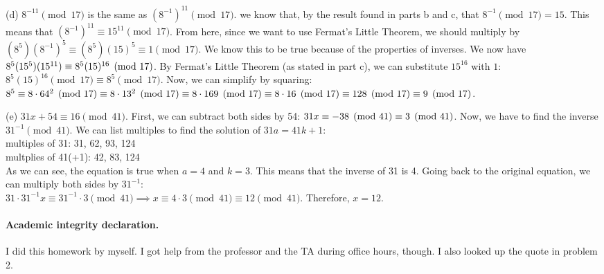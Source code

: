 \documentclass[11pt]{article}
\begin{document}
\begin{solution}
    \pagebreak
    \medskip\noindent
    (d) $8^{-11}\pmod{17}$ is the same 
        as $(8^{-1})^{11}\pmod{17}$.
        we know that, by the result 
        found in parts b and c,
        that $8^{-1}\pmod{17} = 15$.
        This means that
        $(8^{-1})^{11}
        \equiv 15^{11} \pmod{17}$. 
        From here, since we want to use Fermat's 
        Little Theorem, we should multiply by 
        $(8^5)(8^{-1})^{5} \equiv (8^5)(15)^{5} 
        \equiv 1\pmod{17}$.
        We know this to be true because of the properties
        of inverses. We now have
        $8^5(15^5)(15^{11})
        \\\equiv 8^5(15)^{16}\pmod{17}$. By Fermat's 
        Little Theorem (as stated in part c),
        we can substitute $15^{16}$ with $1$: 
        $8^5(15)^{16}\pmod{17} 
        \equiv 8^5\pmod{17}$. Now, we can simplify
        by squaring:
        \\ $8^5 \equiv 8 \cdot 64^2\pmod{17}
        \\ \equiv 8 \cdot 13^2\pmod{17}
        \\ \equiv 8 \cdot 169\pmod{17}
        \\ \equiv 8 \cdot 16\pmod{17}
        \\ \equiv 128\pmod{17}
        \\ \equiv 9\pmod{17}
        $.

        \medskip\noindent
        (e) $31x+54\equiv16\pmod{41}$. 
        First, we can subtract both sides 
        by 54: $31x\equiv-38\pmod{41}
        \\\equiv3\pmod{41}$. Now, we have to find
        the inverse $31^{-1}\pmod{41}$. We can list
        multiples to find the solution of
        $31a = 41k + 1$: 
        \\ multiples of 31: 31, 62, 93, 124
        \\ multplies of 41(+1): 42, 83, 124
        \\ As we can see, the equation is true 
        when $a=4$ and $k=3$. This means that the
        inverse of 31 is 4. Going back to the 
        original equation, we can multiply
        both sides by $31^{-1}$: 
        \\ $31 \cdot 31^{-1}x 
        \equiv 31^{-1}\cdot 3\pmod{41}
        \implies x \equiv 4 \cdot 3 \pmod{41}
        \equiv 12 \pmod{41}
        $. Therefore, $x=12$.
\end{solution}

\paragraph{Academic integrity declaration.} 
I did this homework by myself. I got help from the professor
and the TA during office hours, though. 
I also looked up the quote in problem 2.
\end{document}

